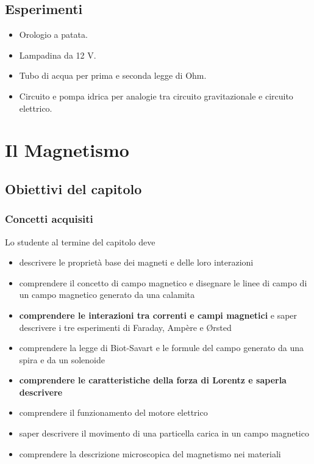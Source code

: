 \documentclass[11pt]{report}
\begin{document}
\section*{Esperimenti}
\begin{itemize}
    \item Orologio a patata.
    \item Lampadina da 12 V.
    \item Tubo di acqua per prima e seconda legge di Ohm.
    \item Circuito e pompa idrica per analogie tra circuito gravitazionale e circuito elettrico.
\end{itemize}

\chapter{Il Magnetismo}

\section*{Obiettivi del capitolo}

\subsection*{Concetti acquisiti}
Lo studente al termine del capitolo deve
\begin{itemize}
    \item descrivere le proprietà base dei magneti e delle loro interazioni
    \item comprendere il concetto di campo magnetico e disegnare le linee di campo di un campo magnetico generato da una calamita
    \item \textbf{comprendere le interazioni tra correnti e campi magnetici} e saper descrivere i tre esperimenti di Faraday, Ampère e Ørsted
    \item comprendere la legge di Biot-Savart e le formule del campo generato da una spira e da un solenoide
    \item \textbf{comprendere le caratteristiche della forza di Lorentz e saperla descrivere}
    \item comprendere il funzionamento del motore elettrico
    \item saper descrivere il movimento di una particella carica in un campo magnetico
    \item comprendere la descrizione microscopica del magnetismo nei materiali
\end{itemize}
\end{document}

